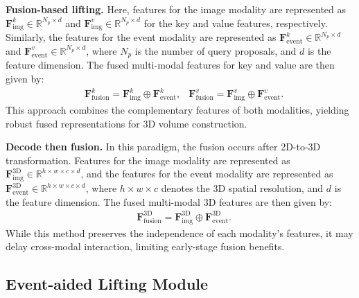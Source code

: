 \noindent\textbf{Fusion-based lifting.} 
Here, features for the image modality are represented as \( \mathbf{F}^{k}_{\text{img}} {\in} \mathbb{R}^{N_p \times d} \) and \( \mathbf{F}^{v}_{\text{img}} {\in} \mathbb{R}^{N_p \times d} \) for the key and value features, respectively. 
Similarly, the features for the event modality are represented as \( \mathbf{F}^{k}_{\text{event}} {\in} \mathbb{R}^{N_p \times d} \) and \( \mathbf{F}^{v}_{\text{event}} {\in} \mathbb{R}^{N_p \times d} \), where \( N_p \) is the number of query proposals, and \( d \) is the feature dimension.
The fused multi-modal features for key and value are then given by:
\begin{align}
&\mathbf{F}^{k}_{\text{fusion}} = \mathbf{F}^{k}_{\text{img}} \oplus \mathbf{F}^{k}_{\text{event}}, 
&\mathbf{F}^{v}_{\text{fusion}} = \mathbf{F}^{v}_{\text{img}} \oplus \mathbf{F}^{v}_{\text{event}}.
\end{align}
This approach combines the complementary features of both modalities, yielding robust fused representations for 3D volume construction.



\noindent\textbf{Decode then fusion.} 
In this paradigm, the fusion occurs after 2D-to-3D transformation. Features for the image modality are represented as \( \mathbf{F}^{\text{3D}}_{\text{img}} {\in} \mathbb{R}^{h \times w \times c \times d} \), and the features for the event modality are represented as \( \mathbf{F}^{\text{3D}}_{\text{event}} {\in} \mathbb{R}^{h \times w \times c \times d} \), where \( h {\times} w {\times} c \) denotes the 3D spatial resolution, and \( d \) is the feature dimension.
The fused multi-modal 3D features are then given by:
\begin{align}
&\mathbf{F}^{\text{3D}}_{\text{fusion}} = \mathbf{F}^{\text{3D}}_{\text{img}} \oplus \mathbf{F}^{\text{3D}}_{\text{event}}.
\end{align}
%
While this method preserves the independence of each modality’s features, it may delay cross-modal interaction, limiting early-stage fusion benefits.



%



\subsection{Event-aided Lifting Module}
%

